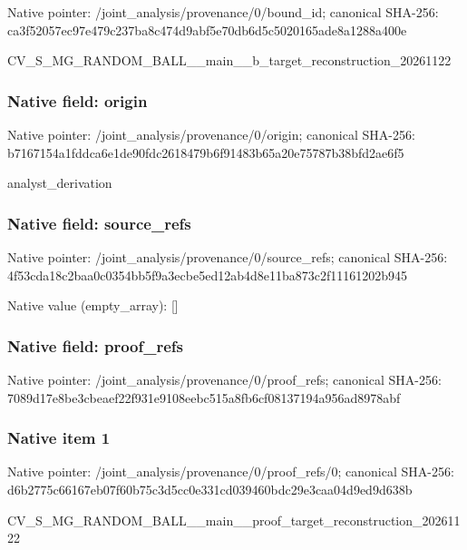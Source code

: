 \documentclass[10pt,a4paper]{article}
\begin{document}
Native pointer: /joint\_analysis/provenance/0/bound\_id; canonical SHA-256: ca3f52057ec97e479c237ba8\allowbreak{}c474d9abf5e70db6d5c50201\allowbreak{}65ade8a1288a400e


CV\_S\_MG\_RANDOM\_BALL\_\_mai\allowbreak{}n\_\_b\_target\_reconstructi\allowbreak{}on\_20261122


\subsubsection{Native field: origin}


Native pointer: /joint\_analysis/provenance/0/origin; canonical SHA-256: b7167154a1fddca6e1de90fd\allowbreak{}c2618479b6f91483b65a20e7\allowbreak{}5787b38bfd2ae6f5


analyst\_derivation


\subsubsection{Native field: source\_refs}


Native pointer: /joint\_analysis/provenan\allowbreak{}ce/0/source\_refs; canonical SHA-256: 4f53cda18c2baa0c0354bb5f\allowbreak{}9a3ecbe5ed12ab4d8e11ba87\allowbreak{}3c2f11161202b945



Native value (empty\_array): []



\subsubsection{Native field: proof\_refs}


Native pointer: /joint\_analysis/provenance/0/proof\_refs; canonical SHA-256: 7089d17e8be3cbeaef22f931\allowbreak{}e9108eebc515a8fb6cf08137\allowbreak{}194a956ad8978abf



\subsubsection{Native item 1}


Native pointer: /joint\_analysis/provenan\allowbreak{}ce/0/proof\_refs/0; canonical SHA-256: d6b2775c66167eb07f60b75c\allowbreak{}3d5cc0e331cd039460bdc29e\allowbreak{}3caa04d9ed9d638b


CV\_S\_MG\_RANDOM\_BALL\_\_mai\allowbreak{}n\_\_proof\_target\_reconstr\allowbreak{}uction\_20261122
\end{document}

